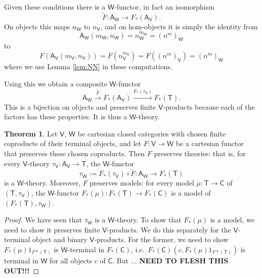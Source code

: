\documentclass{amsart}
\theoremstyle{definition}
\newtheorem{theorem}{Theorem}
\newcommand{\NN}{\mathsf{N}}
\newcommand{\A}{\mathsf{A}}
\newcommand{\V}{\mathsf{V}}
\newcommand{\W}{\mathsf{W}}
\newcommand{\D}{\mathsf{D}}
\newcommand{\C}{\mathsf{C}}
\newcommand{\T}{\mathsf{T}}
\newcommand{\maps}{\colon}
\begin{document}
Given these conditions there is a $\W$-functor, in fact an isomorphism
\[    \tilde{F} \maps \A_\W \to F_*(\A_\V)  . \]
On objects this maps $n_\W$ to $n_\V$, and on hom-objects it is simply the identity from
\[     \A_\W(m_\W, n_\W) = n_\W^{m_\W} = (n^m)_\W \]
to 
\[    F(\A_\V(m_\V, n_\V)) = F(n_\V^{m_\V}) = F((n^m)_\V) = (n^m)_\W \]
where we use Lemma \ref{lem:NN} in these computations.

Using this we obtain a composite $\W$-functor
\[   \A_\W \stackrel{\tilde{F}}{\longrightarrow} 
  F_*(\A_\V) \stackrel{F_*(\tau_\V)}{\longrightarrow} F_*(\T). \]
This is a bijection on objects and preserves finite $\V$-products because each of the factors
has these properties.   It is thus a $\W$-theory.

\begin{theorem}
\label{thm:change-of-base}
Let $\V$, $\W$ be cartesian closed categories with chosen finite coproducts of their terminal objects, and let $F\maps \V \to \W$ be a cartesian functor that preserves these chosen coproducts.  Then $F$ preserves theories: that is, for every $\V$-theory $\tau_\V\maps \A_\V\to \T$, the $\W$-functor 
\[ \tau_\W := F_*(\tau_\V) \circ \tilde{F} \maps \A_\W \to F_*(\T)\]
is a $\W$-theory. Moreover, $F$ preserves models: for every model $\mu \maps\T \to \C$
of $(\T,\tau_\V) $, the $\W$-functor $F_*(\mu) \maps F_*(\T) \to F_*(\C)$ is a model of 
$(F_*(\T), \tau_\W)$.
\end{theorem}

\begin{proof}
We have seen that $\tau_\W$ is a $\W$-theory.   To show that $F_*(\mu)$ is a model, we need
to show it preserves finite $\V$-products.   We do this separately for the $\V$-terminal object and
binary $\V$-products.  For the former, we need to show $F_*(\mu) 1_{F*(\T)}$ is $\W$-terminal
in $F_*(\C)$, i.e.\ $F_*(\C) (c, F_*(\mu) 1_{F*(\T)}) $ is terminal in $\W$ for all objects
$c$ of $\C$.  But ... \textbf{NEED TO FLESH THIS OUT!!!}

\iffalse
	\[\begin{array}{rcll}
	F_*(\D)(F_*(f)(a),F_*(f)(s^{n_\V})) & = & F(\D(f(a),f(t^{n_\V})) & \text{definition of base change}\\
	& \cong & F(\D(f(a),f(t)^{n_\V}) & f \text{ preserves } \NN_\V \text{-powers}\\
	& \cong & F(\D(f(a),f(t))^n) & \text{Lemma \ref{lem:powers_1} for } \V\\
	& \cong & F(\D(f(a),f(t)))^n & F \text{preserves $\V$-products}\\
	& = & F_*(\D)(f(a),f(t))^n & \text{definition of base change}\\
	& \cong & F_*(\D)(f(a),f(t)^{n_\W}) & \text{Lemma \ref{lem:powers_1} for } \W. \qedhere
	\end{array}\]
\fi
\end{proof}
\end{document}
